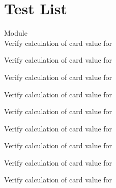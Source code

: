 \chapter{Test List}
\hypertarget{test}{}\label{test}

\begin{DoxyRefList}
\item[Module \doxylink{group___a_i___player}{AI\+\_\+\+Player} ]\hfill \\
\label{test__test000114}%
%
Verify calculation of card value for   



\label{test__test000115}%
%
Verify calculation of card value for   



\label{test__test000116}%
%
Verify calculation of card value for   



\label{test__test000117}%
%
Verify calculation of card value for   



\label{test__test000118}%
%
Verify calculation of card value for   



\label{test__test000119}%
%
Verify calculation of card value for   



\label{test__test000120}%
%
Verify calculation of card value for   



\label{test__test000121}%
%
Verify calculation of card value for   



\label{test__test000122}%
%
Verify calculation of card value for   




\end{DoxyRefList}
